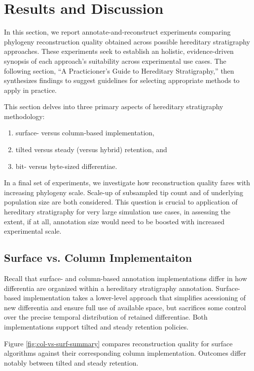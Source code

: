 \section{Results and Discussion} \label{sec:results}

In this section, we report annotate-and-reconstruct experiments comparing phylogeny reconstruction quality obtained across possible hereditary stratigraphy approaches.
These experiments seek to establish an holistic, evidence-driven synopsis of each approach's suitability across experimental use cases.
The following section, ``A Practicioner's Guide to Hereditary Stratigraphy,'' then synthesizes findings to suggest guidelines for selecting appropriate methods to apply in practice.

This section delves into three primary aspects of hereditary stratigraphy methodology:
\begin{enumerate}
\item surface- versus column-based implementation,
\item tilted versus steady (versus hybrid) retention, and
\item bit- versus byte-sized differentiae.
\end{enumerate}

In a final set of experiments, we investigate how reconstruction quality fares with increasing phylogeny scale.
Scale-up of subsampled tip count and of underlying population size are both considered.
This question is crucial to application of hereditary stratigraphy for very large simulation use cases, in assessing the extent, if at all, annotation size would need to be boosted with increased experimental scale.

\subsection{Surface vs. Column Implementaiton} \label{sec:surface-vs-column}



Recall that surface- and column-based annotation implementations differ in how differentia are organized within a hereditary stratigraphy annotation.
Surface-based implementation takes a lower-level approach that simplifies acessioning of new differentia and ensure full use of available space, but sacrifices some control over the precise temporal distribution of retained differentiae.
Both implementations support tilted and steady retention policies.

Figure \ref{fig:col-vs-surf-summary} compares reconstruction quality for surface algorithms against their corresponding column implementation.
Outcomes differ notably between tilted and steady retention.

